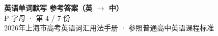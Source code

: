 \documentclass[10pt,a4paper]{article}
\begin{document}
\pagestyle{plain}

\begin{center}
{\LARGE\bfseries 英语单词默写 \quad 参考答案（英 $\to$ 中）}\\[0.22em]
{\large P 字母 · 第 4 / 7 份}\\[0.18em]
{\small 2026年上海市高考英语词汇用法手册 · 参照普通高中英语课程标准}
\end{center}

\vspace{0.2em}
\noindent{\color{rulegray}\rule{\textwidth}{0.8pt}}

\vspace{0.35em}

\vspace{0.25em}
\renewcommand{\arraystretch}{1.32}
\end{document}
